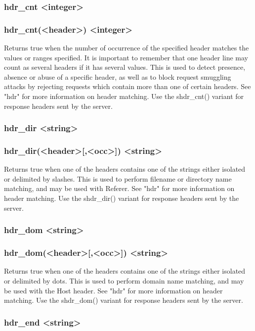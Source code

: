 \subsubsection[hdr\_cnt]{hdr\_cnt <integer>}
\subsubsection*{hdr\_cnt(<header>) <integer>}
  Returns true when the number of occurrence of the specified header matches
  the values or ranges specified. It is important to remember that one header
  line may count as several headers if it has several values. This is used to
  detect presence, absence or abuse of a specific header, as well as to block
  request smuggling attacks by rejecting requests which contain more than one
  of certain headers. See "hdr" for more information on header matching. Use
  the shdr\_cnt() variant for response headers sent by the server.

\subsubsection[hdr\_dir]{hdr\_dir <string>}
\subsubsection*{hdr\_dir(<header>[,<occ>]) <string>}
  Returns true when one of the headers contains one of the strings either
  isolated or delimited by slashes. This is used to perform filename or
  directory name matching, and may be used with Referer. See "hdr" for more
  information on header matching. Use the shdr\_dir() variant for response
  headers sent by the server.

\subsubsection[hdr\_dom]{hdr\_dom <string>}
\subsubsection*{hdr\_dom(<header>[,<occ>]) <string>}
  Returns true when one of the headers contains one of the strings either
  isolated or delimited by dots. This is used to perform domain name matching,
  and may be used with the Host header. See "hdr" for more information on
  header matching. Use the shdr\_dom() variant for response headers sent by the
  server.

\subsubsection[hdr\_end]{hdr\_end <string>}
